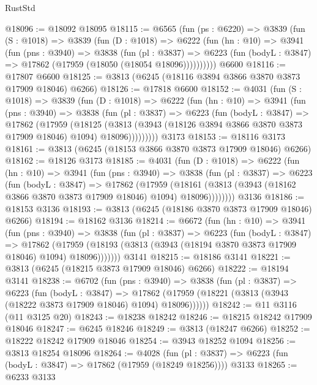 \begin{lexlean}{RustStd}
\begin{coremodule}
@18096 := @18092 @18095
@18115 := @6565
    (fun (ps : @6220) =>
    @3839
      (fun (S : @1018) =>
      @3839
        (fun (D : @1018) =>
        @6222
          (fun (hn : @10) =>
          @3941
            (fun (pns : @3940) =>
            @3838
              (fun (pl : @3837) =>
              @6223 (fun (bodyL : @3847) => @17862 (@17959 (@18050 (@18054 @18096))))))))))
    @6600
@18116 := @17807 @6600
@18125 := @3813 (@6245 (@18116 @3894 @3866 @3870 @3873 @17909 @18046) @6266)
@18126 := @17818 @6600
@18152 := @4031
    (fun (S : @1018) =>
    @3839
      (fun (D : @1018) =>
      @6222
        (fun (hn : @10) =>
        @3941
          (fun (pns : @3940) =>
          @3838
            (fun (pl : @3837) =>
            @6223
              (fun (bodyL : @3847) =>
              @17862
                (@17959
                  (@18125
                    (@3813
                      (@3943 (@18126 @3894 @3866 @3870 @3873 @17909 @18046) @1094)
                      @18096)))))))))
    @3173
@18153 := @18116 @3173
@18161 := @3813 (@6245 (@18153 @3866 @3870 @3873 @17909 @18046) @6266)
@18162 := @18126 @3173
@18185 := @4031
    (fun (D : @1018) =>
    @6222
      (fun (hn : @10) =>
      @3941
        (fun (pns : @3940) =>
        @3838
          (fun (pl : @3837) =>
          @6223
            (fun (bodyL : @3847) =>
            @17862
              (@17959
                (@18161 (@3813 (@3943 (@18162 @3866 @3870 @3873 @17909 @18046) @1094) @18096))))))))
    @3136
@18186 := @18153 @3136
@18193 := @3813 (@6245 (@18186 @3870 @3873 @17909 @18046) @6266)
@18194 := @18162 @3136
@18214 := @6672
    (fun (hn : @10) =>
    @3941
      (fun (pns : @3940) =>
      @3838
        (fun (pl : @3837) =>
        @6223
          (fun (bodyL : @3847) =>
          @17862
            (@17959 (@18193 (@3813 (@3943 (@18194 @3870 @3873 @17909 @18046) @1094) @18096)))))))
    @3141
@18215 := @18186 @3141
@18221 := @3813 (@6245 (@18215 @3873 @17909 @18046) @6266)
@18222 := @18194 @3141
@18238 := @6702
    (fun (pns : @3940) =>
    @3838
      (fun (pl : @3837) =>
      @6223
        (fun (bodyL : @3847) =>
        @17862 (@17959 (@18221 (@3813 (@3943 (@18222 @3873 @17909 @18046) @1094) @18096))))))
@18242 := @11 @3116 (@11 @3125 @20)
@18243 := @18238 @18242
@18246 := @18215 @18242 @17909 @18046
@18247 := @6245 @18246
@18249 := @3813 (@18247 @6266)
@18252 := @18222 @18242 @17909 @18046
@18254 := @3943 @18252 @1094
@18256 := @3813 @18254 @18096
@18264 := @4028
    (fun (pl : @3837) => @6223 (fun (bodyL : @3847) => @17862 (@17959 (@18249 @18256))))
    @3133
@18265 := @6233 @3133

\end{coremodule}
\end{lexlean}
